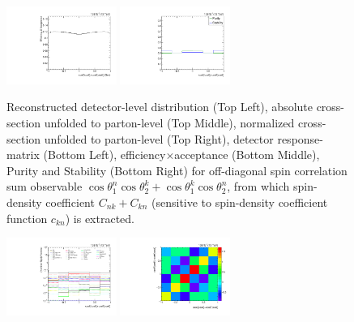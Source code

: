 \begin{refsection}
\begin{figure}[htb]
\begin{center}
 \includegraphics[width=0.32\textwidth]{fig_fullRun2UL/unfolding/combined/TotEff_c_Pnk.pdf}
 \includegraphics[width=0.32\textwidth]{fig_fullRun2UL/unfolding/combined/PurStab_c_Pnk.pdf} \\
\caption{Reconstructed detector-level distribution (Top Left), absolute cross-section unfolded to parton-level (Top Middle), normalized cross-section unfolded to parton-level (Top Right), detector response-matrix (Bottom Left), efficiency$\times$acceptance (Bottom Middle), Purity and Stability (Bottom Right) for off-diagonal spin correlation sum observable $\cos\theta_{1}^{n}\cos\theta_{2}^{k}+\cos\theta_{1}^{k}\cos\theta_{2}^{n}$, from which spin-density coefficient $C_{nk}+C_{kn}$ (sensitive to spin-density coefficient function $c_{k n}$) is extracted.}
\label{fig:c_Pnk}
\end{center}
\end{figure}
\clearpage
\begin{figure}[htb]
\begin{center}
 \includegraphics[width=0.32\textwidth]{fig_fullRun2UL/unfolding/combined/deltaSystCombinedlog_rebinnedB_c_Pnk.pdf}
 \includegraphics[width=0.32\textwidth]{fig_fullRun2UL/unfolding/combined/StatCovMatrix_rebinnedB_c_Pnk.pdf}

\end{center}
\end{figure}
\end{refsection}
